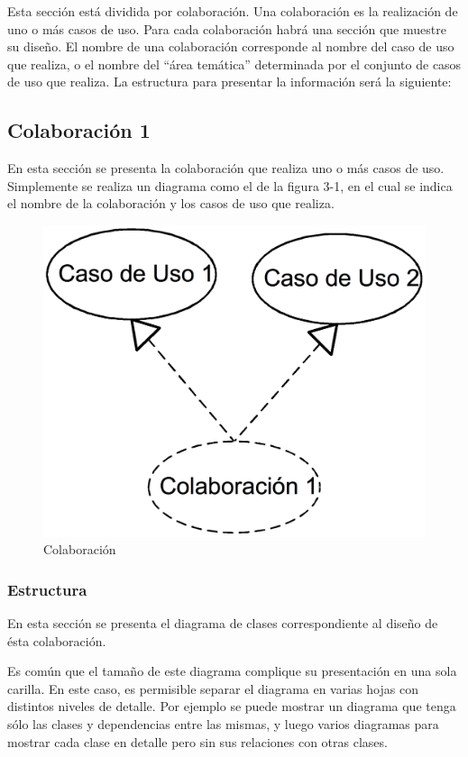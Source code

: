 \documentclass[10pt,spanish]{article}
\numberwithin{figure}{section} %
\begin{document}
\begin{siderules}
Esta sección está dividida por colaboración. Una colaboración es la realización de uno o más casos de uso. Para cada colaboración habrá una sección que muestre su diseño. El nombre de una colaboración corresponde al nombre del caso de uso que realiza, o el nombre del “área temática” determinada por el conjunto de casos de uso que realiza. La estructura para presentar la información será la siguiente:

\subsection{Colaboración 1}
En esta sección se presenta la colaboración que realiza uno o más casos de uso. Simplemente se realiza un diagrama como el de la figura 3-1, en el cual se indica el nombre de la colaboración y los casos de uso que realiza.

\begin{figure}[H]
\centering
\includegraphics[scale=0.15]{ModeloDisenio/Fig3-1.png}
\caption{Colaboración}
\end{figure}
\subsubsection{Estructura}
En esta sección se presenta el diagrama de clases correspondiente al diseño de ésta colaboración.

Es común que el tamaño de este diagrama complique su presentación en una sola carilla. En este caso, es permisible separar el diagrama en varias hojas con distintos niveles de detalle. Por ejemplo se puede mostrar un diagrama que tenga sólo las clases y dependencias entre las mismas, y luego varios diagramas para mostrar cada clase en detalle pero sin sus relaciones con otras clases.


\end{siderules}
\end{document}
